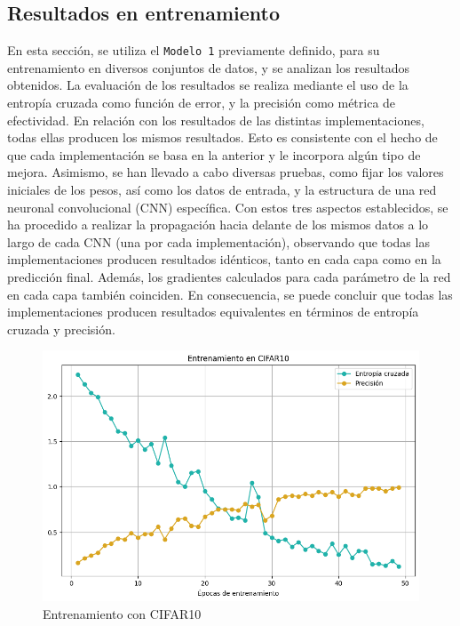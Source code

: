 \subsection{Resultados en entrenamiento}

En esta sección, se utiliza el \texttt{Modelo 1} previamente definido, para su entrenamiento en diversos conjuntos de datos, y se analizan los resultados obtenidos. La evaluación de los resultados se realiza mediante el uso de la entropía cruzada como función de error, y la precisión como métrica de efectividad. En relación con los resultados de las distintas implementaciones, todas ellas producen los mismos resultados. Esto es consistente con el hecho de que cada implementación se basa en la anterior y le incorpora algún tipo de mejora. Asimismo, se han llevado a cabo diversas pruebas, como fijar los valores iniciales de los pesos, así como los datos de entrada, y la estructura de una red neuronal convolucional (CNN) específica. Con estos tres aspectos establecidos, se ha procedido a realizar la propagación hacia delante de los mismos datos a lo largo de cada CNN (una por cada implementación), observando que todas las implementaciones producen resultados idénticos, tanto en cada capa como en la predicción final. Además, los gradientes calculados para cada parámetro de la red en cada capa también coinciden. En consecuencia, se puede concluir que todas las implementaciones producen resultados equivalentes en términos de entropía cruzada y precisión. 

\begin{figure}[H]
	\centering
	\includegraphics[scale=0.5]{imagenes/cifar10.png}  
	\caption{Entrenamiento con CIFAR10}
	\label{fig:cifar10}
\end{figure}


